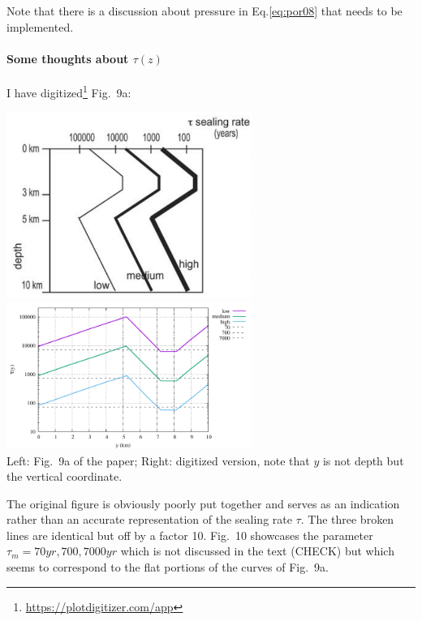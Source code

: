 Note that there is a discussion about pressure in Eq.\eqref{eq:por08} that needs to be implemented.

\paragraph{Some thoughts about $\tau(z)$}

I have digitized\footnote{\url{https://plotdigitizer.com/app}} Fig.~9a:
\begin{center}
\includegraphics[width=8cm]{python_codes/fieldstone_126/images/grfr03f}
\includegraphics[width=8cm]{python_codes/fieldstone_126/images/tau.pdf}\\
{\captionfont Left: Fig.~9a of the paper; Right: digitized version, note that $y$ is not depth but the
vertical coordinate.}
\end{center}
The original figure is obviously poorly put together and serves as an indication rather than 
an accurate representation of the sealing rate $\tau$.
The three broken lines are identical but off by a factor 10.  
Fig.~10 showcases the parameter $\tau_m=70yr,700,7000yr$ which is not discussed in the text (CHECK)
but which seems to correspond to the flat portions of the curves of Fig.~9a.

